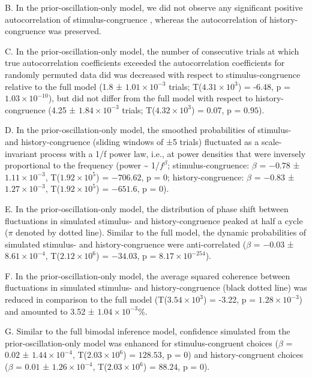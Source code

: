 \documentclass[
]{article}
\begin{document}
B. In the prior-oscillation-only model, we did not observe any
significant positive autocorrelation of stimulus-congruence , whereas
the autocorrelation of history-congruence was preserved.

C. In the prior-oscillation-only model, the number of consecutive trials
at which true autocorrelation coefficients exceeded the autocorrelation
coefficients for randomly permuted data did was decreased with respect
to stimulus-congruence relative to the full model (1.8 ±
\ensuremath{1.01\times 10^{-3}} trials;
T(\ensuremath{4.31\times 10^{3}}) = -6.48, p =
\(\ensuremath{1.03\times 10^{-10}}\)), but did not differ from the full
model with respect to history-congruence (4.25 ±
\ensuremath{1.84\times 10^{-3}} trials;
T(\ensuremath{4.32\times 10^{3}}) = 0.07, p = \(0.95\)).

D. In the prior-oscillation-only model, the smoothed probabilities of
stimulus- and history-congruence (sliding windows of ±5 trials)
fluctuated as a scale-invariant process with a 1/f power law, i.e., at
power densities that were inversely proportional to the frequency (power
\textasciitilde{} 1/\(f^\beta\); stimulus-congruence: \(\beta\) =
\(-0.78\) ± \(\ensuremath{1.11\times 10^{-3}}\),
T(\(\ensuremath{1.92\times 10^{5}}\)) = \(-706.62\), p = \(0\);
history-congruence: \(\beta\) = \(-0.83\) ±
\(\ensuremath{1.27\times 10^{-3}}\),
T(\(\ensuremath{1.92\times 10^{5}}\)) = \(-651.6\), p = \(0\)).

E. In the prior-oscillation-only model, the distribution of phase shift
between fluctuations in simulated stimulus- and history-congruence
peaked at half a cycle (\(\pi\) denoted by dotted line). Similar to the
full model, the dynamic probabilities of simulated stimulus- and
history-congruence were anti-correlated (\(\beta\) = \(-0.03\) ±
\(\ensuremath{8.61\times 10^{-4}}\),
T(\(\ensuremath{2.12\times 10^{6}}\)) = \(-34.03\), p =
\(\ensuremath{8.17\times 10^{-254}}\)).

F. In the prior-oscillation-only model, the average squared coherence
between fluctuations in simulated stimulus- and history-congruence
(black dotted line) was reduced in comparison to the full model
(T(\ensuremath{3.54\times 10^{3}}) = -3.22, p =
\(\ensuremath{1.28\times 10^{-3}}\)) and amounted to 3.52 ±
\ensuremath{1.04\times 10^{-3}}\%.

G. Similar to the full bimodal inference model, confidence simulated
from the prior-oscillation-only model was enhanced for
stimulus-congruent choices (\(\beta\) = \(0.02\) ±
\(\ensuremath{1.44\times 10^{-4}}\),
T(\(\ensuremath{2.03\times 10^{6}}\)) = \(128.53\), p = \(0\)) and
history-congruent choices (\(\beta\) = \(0.01\) ±
\(\ensuremath{1.26\times 10^{-4}}\),
T(\(\ensuremath{2.03\times 10^{6}}\)) = \(88.24\), p = \(0\)).
\end{document}
